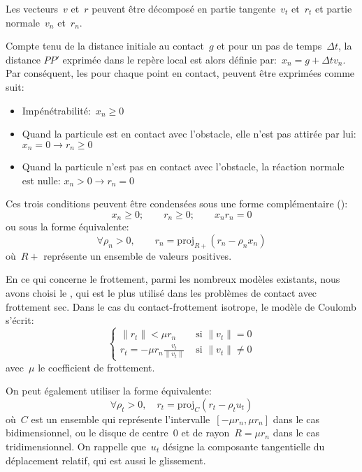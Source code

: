 Les vecteurs~$v$ et~$r$ peuvent être décomposé en partie tangente~$v_t$ et~$r_t$ et partie normale~$v_n$ et~$r_n$.

Compte tenu de la distance initiale au contact~$g$ et pour un pas de temps~$\Delta t$, la distance $PP'$ exprimée dans le repère local est alors définie par:~$x_n = g + \Delta t v_n$. Par conséquent, les  pour chaque point en contact, peuvent être exprimées comme suit:
\begin{itemize}
  \item Impénétrabilité:~$x_n \ge 0$
  \item Quand la particule est en contact avec l'obstacle, elle n'est pas attirée par lui:
	$x_n = 0 \rightarrow r_n \ge 0$
  \item Quand la particule n'est pas en contact avec l'obstacle, la réaction normale est nulle:
	$x_n > 0 \rightarrow r_n = 0$
\end{itemize}
Ces trois conditions peuvent être condensées sous une forme complémentaire ():
\begin{equation} x_n \ge 0; \qquad r_n \ge 0; \qquad x_n r_n = 0 \end{equation}
ou sous la forme équivalente:
\begin{equation} \forall \rho_n > 0, \qquad r_n = \mathrm{proj}_{R+} (r_n - \rho_n x_n) \end{equation}
où~$R+$ représente un ensemble de valeurs positives.

\medskip
En ce qui concerne le frottement, parmi les nombreux modèles existants, nous avons choisi le , qui est le plus utilisé dans les problèmes de contact avec frottement sec. Dans le cas du contact-frottement isotrope, le modèle de Coulomb s'écrit:
\begin{equation} \left\{\begin{array}{ll}
\|r_t\| < \mu r_n & \text{ si } \|v_t\|=0\\
r_t=-\mu r_n \frac{v_t}{\|v_t\|} & \text{ si } \|v_t\|\ne0
\end{array}\right. \end{equation}
avec~$\mu$ le coefficient de frottement.

On peut également utiliser la forme équivalente:
\begin{equation} \forall \rho_t>0, \quad r_t= \mathrm{proj}_C (r_t-\rho_t u_t) \end{equation}
où~$C$ est un ensemble qui représente l'intervalle~$[-\mu r_n, \mu r_n]$ dans le cas bidimensionnel, ou le disque de centre~$0$ et de rayon~$R= \mu r_n$ dans le cas tridimensionnel. On rappelle que~$u_t$ désigne la composante tangentielle du déplacement relatif, qui est aussi le glissement.


